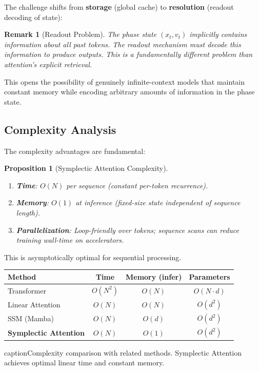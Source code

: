 \documentclass[12pt,letterpaper,twoside]{article}
\newtheorem{remarque}{Remark}[section]
\newtheorem{prop}{Proposition}[section]
\begin{document}
The challenge shifts from \textbf{storage} (global cache) to \textbf{resolution} (readout decoding of state):

\begin{remarque}[Readout Problem]
The phase state $(x_t, v_t)$ implicitly contains information about all past tokens. The readout mechanism must decode this information to produce outputs. This is a fundamentally different problem than attention's explicit retrieval.
\end{remarque}

This opens the possibility of genuinely infinite-context models that maintain constant memory while encoding arbitrary amounts of information in the phase state.

\subsection{Complexity Analysis}

The complexity advantages are fundamental:

\begin{prop}[Symplectic Attention Complexity]
\begin{enumerate}
\item \textbf{Time}: $O(N)$ per sequence (constant per-token recurrence).
\item \textbf{Memory}: $O(1)$ at inference (fixed-size state independent of sequence length).
\item \textbf{Parallelization}: Loop-friendly over tokens; sequence scans can reduce training wall-time on accelerators.
\end{enumerate}
\end{prop}

This is asymptotically optimal for sequential processing.

\begin{table}[htbp]
\centering
\begin{tabular}{lccc}
\toprule
Method & Time & Memory (infer) & Parameters \\ \midrule
Transformer & $O(N^2)$ & $O(N)$ & $O(N \cdot d)$ \\
Linear Attention & $O(N)$ & $O(N)$ & $O(d^2)$ \\
SSM (Mamba) & $O(N)$ & $O(d)$ & $O(d^2)$ \\
\textbf{Symplectic Attention} & $O(N)$ & $O(1)$ & $O(d^2)$ \\ \bottomrule
\end{tabular}
caption{Complexity comparison with related methods. Symplectic Attention achieves optimal linear time and constant memory.}
\label{tab:complexity-comparison}
\end{table}
\end{document}
